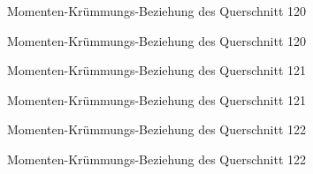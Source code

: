 \documentclass[
  11pt,
  letterpaper,
]{scrreprt}
\begin{document}
\begin{figure}[H]


\caption{\label{fig-qs_120}Momenten-Krümmungs-Beziehung des Querschnitt
120}

\end{figure}%

\begin{figure}[H]


\caption{\label{fig-m_chi_120}Momenten-Krümmungs-Beziehung des
Querschnitt 120}

\end{figure}%

\begin{figure}[H]


\caption{\label{fig-qs_121}Momenten-Krümmungs-Beziehung des Querschnitt
121}

\end{figure}%

\begin{figure}[H]


\caption{\label{fig-m_chi_121}Momenten-Krümmungs-Beziehung des
Querschnitt 121}

\end{figure}%

\begin{figure}[H]


\caption{\label{fig-qs_122}Momenten-Krümmungs-Beziehung des Querschnitt
122}

\end{figure}%

\begin{figure}[H]


\caption{\label{fig-m_chi_122}Momenten-Krümmungs-Beziehung des
Querschnitt 122}

\end{figure}%
\end{document}
